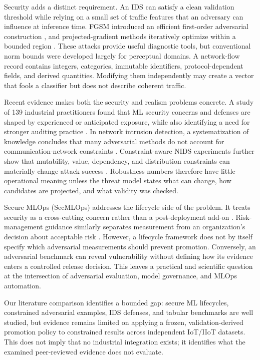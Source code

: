 \documentclass[runningheads]{llncs}
\begin{document}
Security adds a distinct requirement. An IDS can satisfy a clean validation threshold while relying on a small set of traffic features that an adversary can influence at inference time. FGSM introduced an efficient first-order adversarial construction \cite{goodfellow2015fgsm}, and projected-gradient methods iteratively optimize within a bounded region \cite{madry2018pgd}. These attacks provide useful diagnostic tools, but conventional norm bounds were developed largely for perceptual domains. A network-flow record contains integers, categories, immutable identifiers, protocol-dependent fields, and derived quantities. Modifying them independently may create a vector that fools a classifier but does not describe coherent traffic.

Recent evidence makes both the security and realism problems concrete. A study of 139 industrial practitioners found that ML security concerns and defenses are shaped by experienced or anticipated exposure, while also identifying a need for stronger auditing practice \cite{grosse2023industry}. In network intrusion detection, a systematization of knowledge concludes that many adversarial methods do not account for communication-network constraints \cite{vitorino2023sok}. Constraint-aware NIDS experiments further show that mutability, value, dependency, and distribution constraints can materially change attack success \cite{alhussien2024constraining}. Robustness numbers therefore have little operational meaning unless the threat model states what can change, how candidates are projected, and what validity was checked.

Secure MLOps (SecMLOps) addresses the lifecycle side of the problem. It treats security as a cross-cutting concern rather than a post-deployment add-on \cite{zhang2022secmlops,zhang2026secmlops}. Risk-management guidance similarly separates measurement from an organization's decision about acceptable risk \cite{tabassi2023airmf,vassilev2025taxonomy}. However, a lifecycle framework does not by itself specify which adversarial measurements should prevent promotion. Conversely, an adversarial benchmark can reveal vulnerability without defining how its evidence enters a controlled release decision. This leaves a practical and scientific question at the intersection of adversarial evaluation, model governance, and MLOps automation.

Our literature comparison identifies a bounded gap: secure ML lifecycles, constrained adversarial examples, IDS defenses, and tabular benchmarks are well studied, but evidence remains limited on applying a frozen, validation-derived promotion policy to constrained results across independent IoT/IIoT datasets. This does not imply that no industrial integration exists; it identifies what the examined peer-reviewed evidence does not evaluate.
\end{document}
